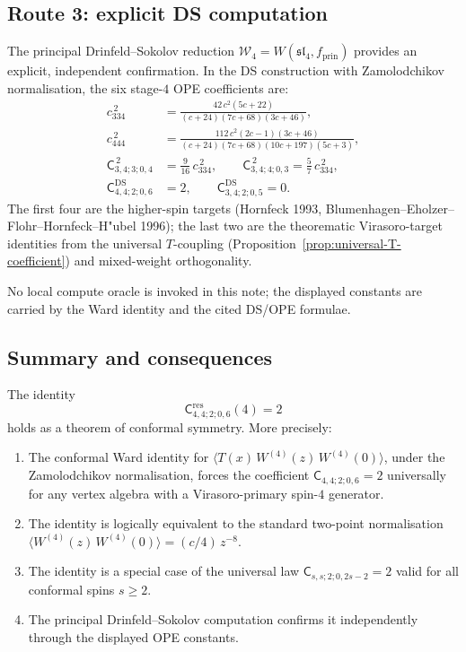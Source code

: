 \documentclass[11pt]{article}
\newcommand{\cW}{\mathcal{W}}
\newcommand{\fsl}{\mathfrak{sl}}
\begin{document}
\subsection{Route 3: explicit DS computation}

The principal Drinfeld--Sokolov reduction $\cW_4 = W(\fsl_4, f_{\mathrm{prin}})$
provides an explicit, independent confirmation.  In the DS construction with
Zamolodchikov normalisation, the six stage-$4$ OPE coefficients are:
\begin{align*}
c_{334}^{\,2}
&= \frac{42\,c^2(5c+22)}{(c+24)(7c+68)(3c+46)},
\\[3pt]
c_{444}^{\,2}
&= \frac{112\,c^2(2c-1)(3c+46)}{(c+24)(7c+68)(10c+197)(5c+3)},
\\[3pt]
\mathsf{C}_{3,4;3;0,4}^{\,2}
&= \tfrac{9}{16}\,c_{334}^{\,2},
\qquad
\mathsf{C}_{3,4;4;0,3}^{\,2}
= \tfrac{5}{7}\,c_{334}^{\,2},
\\[3pt]
\mathsf{C}^{\mathrm{DS}}_{4,4;2;0,6}
&= 2,
\qquad
\mathsf{C}^{\mathrm{DS}}_{3,4;2;0,5}
= 0.
\end{align*}
The first four are the higher-spin targets (Hornfeck 1993,
Blumenhagen--Eholzer--Flohr--Hornfeck--H"ubel 1996); the last two are
the theorematic Virasoro-target identities from the universal $T$-coupling
(Proposition~\ref{prop:universal-T-coefficient}) and mixed-weight orthogonality.

No local compute oracle is invoked in this note; the displayed
constants are carried by the Ward identity and the cited DS/OPE
formulae.

\subsection{Summary and consequences}

\begin{theorem}
\label{thm:critical-scalar-verified}
The identity
\[
\mathsf{C}^{\mathrm{res}}_{4,4;2;0,6}(4)=2
\]
holds as a theorem of conformal symmetry.  More precisely:
\begin{enumerate}[label=\textup{(\roman*)}]
\item The conformal Ward identity for
  $\langle T(x)\,W^{(4)}(z)\,W^{(4)}(0)\rangle$, under the Zamolodchikov
  normalisation, forces the coefficient $\mathsf{C}_{4,4;2;0,6}=2$
  universally for any vertex algebra with a Virasoro-primary spin-$4$
  generator.
\item The identity is logically equivalent to the standard two-point
  normalisation $\langle W^{(4)}(z)\,W^{(4)}(0)\rangle = (c/4)\,z^{-8}$.
\item The identity is a special case of the universal law
  $\mathsf{C}_{s,s;2;0,2s-2}=2$ valid for all conformal spins $s\ge 2$.
\item The principal Drinfeld--Sokolov computation confirms it independently
  through the displayed OPE constants.
\end{enumerate}
\end{theorem}
\end{document}
